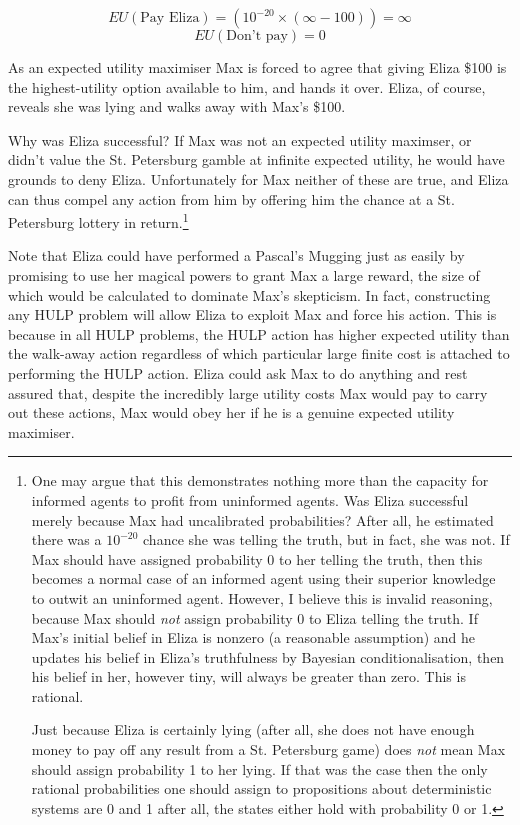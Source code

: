 \documentclass{article}
\begin{document}
\[EU(\mbox{Pay Eliza})=(10^{-20}\times(\infty-100)) = \infty\]
\[EU(\mbox{Don't pay})=0\]

As an expected utility maximiser Max is forced to agree that giving Eliza \$100 is the highest-utility option available to him, and hands it over. Eliza, of course, reveals she was lying and walks away with Max's \$100.

Why was Eliza successful? If Max was not an expected utility maximser, or didn't value the St. Petersburg gamble at infinite expected utility, he would have grounds to deny Eliza. Unfortunately for Max neither of these are true, and Eliza can thus compel any action from him by offering him the chance at a St. Petersburg lottery in return.\footnote{One may argue that this demonstrates nothing more than the capacity for informed agents to profit from uninformed agents. Was Eliza successful merely because Max had uncalibrated probabilities? After all, he estimated there was a \(10^{-20}\) chance she was telling the truth, but in fact, she was not. If Max should have assigned probability 0 to her telling the truth, then this becomes a normal case of an informed agent using their superior knowledge to outwit an uninformed agent. However, I believe this is invalid reasoning, because Max should \textit{not} assign probability 0 to Eliza telling the truth. If Max's initial belief in Eliza is nonzero (a reasonable assumption) and he updates his belief in Eliza's truthfulness by Bayesian conditionalisation, then his belief in her, however tiny, will always be greater than zero. This is rational. 

Just because Eliza is certainly lying (after all, she does not have enough money to pay off any result from a St. Petersburg game) does \textit{not} mean Max should assign probability 1 to her lying. If that was the case then the only rational probabilities one should assign to propositions about deterministic systems are 0 and 1 \textemdash{} after all, the states either hold with probability 0 or 1.}

Note that Eliza could have performed a Pascal's Mugging just as easily by promising to use her magical powers to grant Max a large reward, the size of which would be calculated to dominate Max's skepticism. In fact, constructing any HULP problem will allow Eliza to exploit Max and force his action. This is because in all HULP problems, the HULP action has higher expected utility than the walk-away action regardless of which particular large finite cost is attached to performing the HULP action. Eliza could ask Max to do anything and rest assured that, despite the incredibly large utility costs Max would pay to carry out these actions, Max would obey her if he is a genuine expected utility maximiser.
\end{document}
